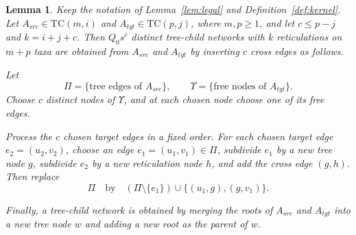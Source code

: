 \documentclass[11pt]{article}
\newtheorem{lemma}[theorem]{Lemma}
\theoremstyle{definition}
\theoremstyle{remark}
\newcommand{\rise}[2]{#1^{\overline{#2}}}
\newcommand{\TC}{\text{TC}}
\begin{document}
\begin{lemma}\label{lem:trace}
Keep the notation of Lemma~\ref{lem:legal} and Definition~\ref{def:kernel}. Let
$A_{src}\in\TC(m,i)$ and $A_{tgt}\in\TC(p,j)$, where $m,p\geq1$, and let
$c\leq p-j$ and $k=i+j+c$. Then
{\color{red} $Q_0\rise{s}{c}$ distinct tree-child networks} with $k$ reticulations on $m+p$ taxa are obtained
from $A_{src}$ and $A_{tgt}$ by inserting $c$ cross edges as follows.

Let
\[
\Pi=\{\text{tree edges of }A_{src}\},
\qquad
\Upsilon=\{\text{free nodes of }A_{tgt}\}.
\]
Choose $c$ distinct nodes of $\Upsilon$, and at each chosen node choose
one of its free edges. 

Process the $c$ chosen target edges in a fixed order. For each chosen
target edge $e_2=(u_2,v_2)$, choose an edge
$e_1=(u_1,v_1)\in\Pi$, subdivide $e_1$ by a new tree node $g$,
subdivide $e_2$ by a new reticulation node $h$, and add the cross edge
$(g,h)$. Then replace
\[
\Pi
\quad\text{by}\quad
(\Pi\setminus\{e_1\})\cup\{(u_1,g),(g,v_1)\}.
\]

Finally, a tree-child network is obtained by merging the roots of $A_{src}$ and $A_{tgt}$ into a new tree node $w$
and adding a new root as the parent of $w$.
\end{lemma}
\end{document}
